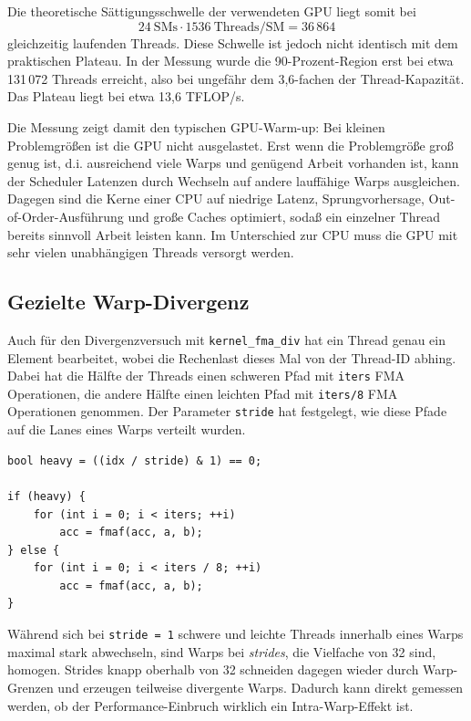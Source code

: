 Die theoretische Sättigungsschwelle der verwendeten GPU liegt somit bei
\[
24\ \mathrm{SMs} \cdot 1536\ \mathrm{Threads/SM} = 36\,864
\]
gleichzeitig laufenden Threads. Diese Schwelle ist jedoch nicht identisch mit
dem praktischen Plateau. In der Messung wurde die 90-Prozent-Region erst bei
etwa 131\,072 Threads erreicht, also bei ungefähr dem
3{,}6-fachen der Thread-Kapazität. Das Plateau liegt bei etwa
13{,}6 TFLOP/s.

Die Messung zeigt damit den typischen GPU-Warm-up: Bei kleinen
Problemgrößen ist die GPU nicht ausgelastet. Erst wenn die Problemgröße groß genug ist, 
d.i. ausreichend viele Warps und genügend Arbeit vorhanden ist, kann der Scheduler Latenzen durch
Wechseln auf andere lauffähige Warps ausgleichen. Dagegen sind die Kerne einer CPU
auf niedrige Latenz, Sprungvorhersage, Out-of-Order-Ausführung und
große Caches optimiert, sodaß ein einzelner Thread bereits sinnvoll Arbeit leisten kann.
Im Unterschied zur CPU muss die GPU mit sehr vielen unabhängigen Threads versorgt werden.

\subsection{Gezielte Warp-Divergenz}

Auch für den Divergenzversuch mit \texttt{kernel\_fma\_div} hat ein Thread genau ein Element bearbeitet,
wobei die Rechenlast dieses Mal von der Thread-ID abhing. Dabei hat die Hälfte der Threads 
einen schweren Pfad mit \texttt{iters} FMA Operationen, die andere Hälfte
einen leichten Pfad mit \texttt{iters/8} FMA Operationen genommen. Der Parameter \texttt{stride}
hat festgelegt, wie diese Pfade auf die Lanes eines Warps verteilt wurden.

\begin{verbatim}
bool heavy = ((idx / stride) & 1) == 0;

if (heavy) {
    for (int i = 0; i < iters; ++i)
        acc = fmaf(acc, a, b);
} else {
    for (int i = 0; i < iters / 8; ++i)
        acc = fmaf(acc, a, b);
}
\end{verbatim}

Während sich bei \texttt{stride = 1} schwere und leichte Threads innerhalb eines
Warps maximal stark abwechseln, sind Warps bei \textit{strides}, die Vielfache
von 32 sind, homogen. Strides knapp oberhalb von 32 schneiden dagegen wieder
durch Warp-Grenzen und erzeugen teilweise divergente Warps. Dadurch kann direkt
gemessen werden, ob der Performance-Einbruch wirklich ein Intra-Warp-Effekt ist.

